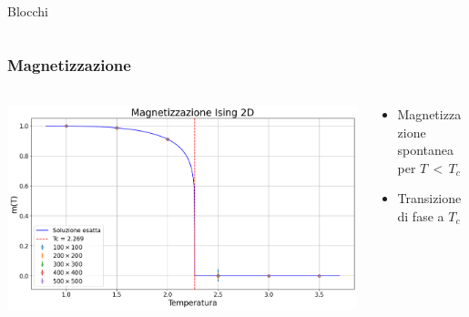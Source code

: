 \begin{frame}
\begin{columns}
\begin{column}{0.33\textwidth}
\begin{block}{Blocchi}
            \end{block}        
        \end{column}
    \end{columns}
\end{frame}



\begin{frame}
    \frametitle{Magnetizzazione}
    \framesubtitle{}

    \begin{columns}
        \begin{column}{0.6\textwidth}

            \centering
            \includegraphics[width=\textwidth]{Immagini/simIsing2D/magn.png}

        \end{column}
    
        \begin{column}{0.4\textwidth}

                \begin{itemize}[itemsep=0.5em, label=$\diamond$]
                    \item Magnetizzazione spontanea per $T\,<\,T_c$
                    \item Transizione di fase a $T_c$
                \end{itemize}
            
        \end{column}
    \end{columns}

    \centering

\end{frame}



